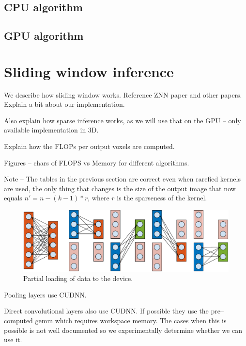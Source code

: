 \documentclass[conference]{IEEEtran}
\begin{document}
\subsection{CPU algorithm}
\subsection{GPU algorithm}

\section{Sliding window inference}

We describe how sliding window works.  Reference ZNN paper and other
papers.  Explain a bit about our implementation.

Also explain how sparse inference works, as we will use that on the
GPU -- only available implementation in 3D.

Explain how the FLOPs per output voxels are computed.

Figures -- chars of FLOPS vs Memory for different algorithms.

Note -- The tables in the previous section are correct even when
rarefied kernels are used, the only thing that changes is the size of
the output image that now equals $n' = n - (k-1)*r$, where $r$ is the
sparseness of the kernel.



\begin{figure}
  \begin{center}
  \includegraphics[width=0.95\columnwidth]{fig/gpuram.pdf}
  \end{center}
  \caption{Partial loading of data to the device.}
  \label{fig:partial_exec}
\end{figure}

Pooling layers use CUDNN.

Direct convolutional layers also use CUDNN.  If possible they use the
pre--computed gemm which requires workspace memory.  The cases when
this is possible is not well documented so we experimentally determine
whether we can use it.
\end{document}
